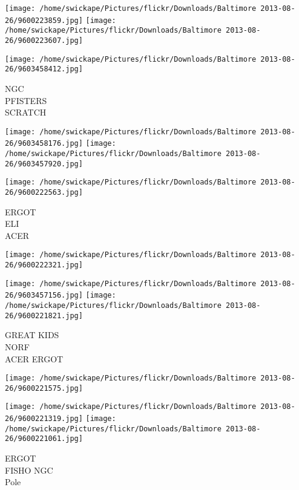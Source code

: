 \documentclass[10pt,letterpaper]{article}
\begin{document}
\texttt{[image: /home/swickape/Pictures/flickr/Downloads/Baltimore 2013-08-26/9600223859.jpg]}
\texttt{[image: /home/swickape/Pictures/flickr/Downloads/Baltimore 2013-08-26/9600223607.jpg]}

\vspace{0.25in}
\texttt{[image: /home/swickape/Pictures/flickr/Downloads/Baltimore 2013-08-26/9603458412.jpg]}

NGC\\
PFISTERS\\
SCRATCH\\
\pagebreak

\texttt{[image: /home/swickape/Pictures/flickr/Downloads/Baltimore 2013-08-26/9603458176.jpg]}
\texttt{[image: /home/swickape/Pictures/flickr/Downloads/Baltimore 2013-08-26/9603457920.jpg]}

\texttt{[image: /home/swickape/Pictures/flickr/Downloads/Baltimore 2013-08-26/9600222563.jpg]}

ERGOT\\
ELI\\
ACER\\
\pagebreak

\texttt{[image: /home/swickape/Pictures/flickr/Downloads/Baltimore 2013-08-26/9600222321.jpg]}

\vspace{0.25in}
\texttt{[image: /home/swickape/Pictures/flickr/Downloads/Baltimore 2013-08-26/9603457156.jpg]}
\texttt{[image: /home/swickape/Pictures/flickr/Downloads/Baltimore 2013-08-26/9600221821.jpg]}

GREAT KIDS\\
NORF\\
ACER ERGOT\\
\pagebreak

\texttt{[image: /home/swickape/Pictures/flickr/Downloads/Baltimore 2013-08-26/9600221575.jpg]}

\vspace{0.25in}
\texttt{[image: /home/swickape/Pictures/flickr/Downloads/Baltimore 2013-08-26/9600221319.jpg]}
\texttt{[image: /home/swickape/Pictures/flickr/Downloads/Baltimore 2013-08-26/9600221061.jpg]}

ERGOT\\
FISHO NGC\\
Pole\\
\pagebreak
\end{document}
